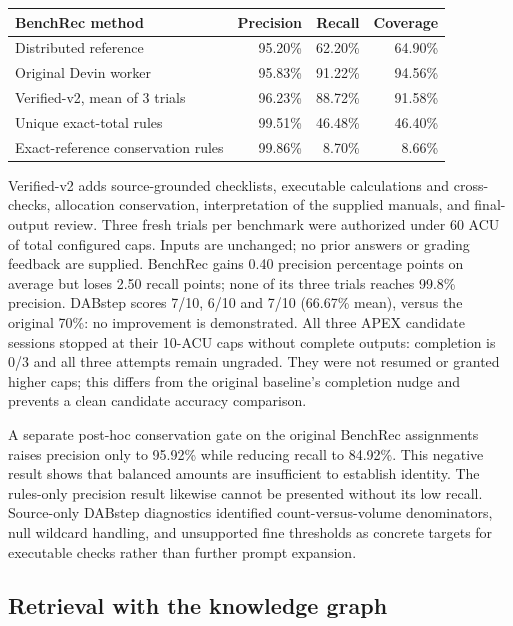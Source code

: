 \documentclass[11pt]{article}
\begin{document}
\begin{center}
\small
\begin{tabular}{@{}lrrr@{}}
\toprule
\textbf{BenchRec method} & \textbf{Precision} & \textbf{Recall} & \textbf{Coverage} \\
\midrule
Distributed reference & 95.20\% & 62.20\% & 64.90\% \\
Original Devin worker & 95.83\% & 91.22\% & 94.56\% \\
Verified-v2, mean of 3 trials & 96.23\% & 88.72\% & 91.58\% \\
Unique exact-total rules & 99.51\% & 46.48\% & 46.40\% \\
Exact-reference conservation rules & 99.86\% & 8.70\% & 8.66\% \\
\bottomrule
\end{tabular}
\end{center}

Verified-v2 adds source-grounded checklists, executable calculations and cross-checks, allocation conservation, interpretation of the supplied manuals, and final-output review. Three fresh trials per benchmark were authorized under 60 ACU of total configured caps. Inputs are unchanged; no prior answers or grading feedback are supplied. BenchRec gains 0.40 precision percentage points on average but loses 2.50 recall points; none of its three trials reaches 99.8\% precision. DABstep scores 7/10, 6/10 and 7/10 (66.67\% mean), versus the original 70\%: no improvement is demonstrated. All three APEX candidate sessions stopped at their 10-ACU caps without complete outputs: completion is 0/3 and all three attempts remain ungraded. They were not resumed or granted higher caps; this differs from the original baseline's completion nudge and prevents a clean candidate accuracy comparison.

A separate post-hoc conservation gate on the original BenchRec assignments raises precision only to 95.92\% while reducing recall to 84.92\%. This negative result shows that balanced amounts are insufficient to establish identity. The rules-only precision result likewise cannot be presented without its low recall. Source-only DABstep diagnostics identified count-versus-volume denominators, null wildcard handling, and unsupported fine thresholds as concrete targets for executable checks rather than further prompt expansion.

\subsection{Retrieval with the knowledge graph}
\end{document}
